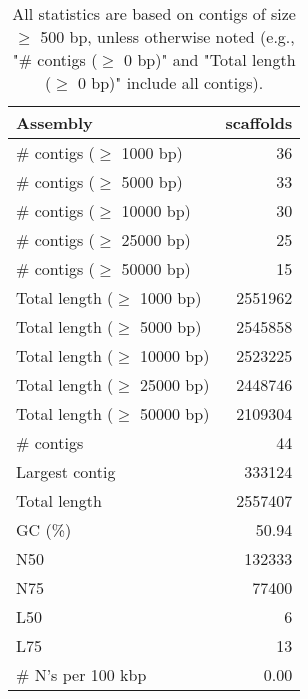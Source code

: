 \documentclass[12pt,a4paper]{article}
\begin{document}
\begin{table}[ht]
\begin{center}
\caption{All statistics are based on contigs of size $\geq$ 500 bp, unless otherwise noted (e.g., "\# contigs ($\geq$ 0 bp)" and "Total length ($\geq$ 0 bp)" include all contigs).}
\begin{tabular}{|l*{1}{|r}|}
\hline
Assembly & scaffolds \\ \hline
\# contigs ($\geq$ 1000 bp) & 36 \\ \hline
\# contigs ($\geq$ 5000 bp) & 33 \\ \hline
\# contigs ($\geq$ 10000 bp) & 30 \\ \hline
\# contigs ($\geq$ 25000 bp) & 25 \\ \hline
\# contigs ($\geq$ 50000 bp) & 15 \\ \hline
Total length ($\geq$ 1000 bp) & 2551962 \\ \hline
Total length ($\geq$ 5000 bp) & 2545858 \\ \hline
Total length ($\geq$ 10000 bp) & 2523225 \\ \hline
Total length ($\geq$ 25000 bp) & 2448746 \\ \hline
Total length ($\geq$ 50000 bp) & 2109304 \\ \hline
\# contigs & 44 \\ \hline
Largest contig & 333124 \\ \hline
Total length & 2557407 \\ \hline
GC (\%) & 50.94 \\ \hline
N50 & 132333 \\ \hline
N75 & 77400 \\ \hline
L50 & 6 \\ \hline
L75 & 13 \\ \hline
\# N's per 100 kbp & 0.00 \\ \hline
\end{tabular}
\end{center}
\end{table}
\end{document}
